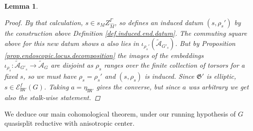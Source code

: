 \documentclass[openany]{amsbook}
\newtheorem{lemma}[theorem]{Lemma}
\theoremstyle{definition}
\theoremstyle{remark}
\numberwithin{equation}{section}
\newcommand{\cA}{\mathcal{A}}
\newcommand{\cE}{\mathcal{E}}
\renewcommand{\-}{\operatorname{-}}
\newcommand{\ctA}{\widetilde{\cA}}
\newcommand{\fM}{\mathfrak{M}}
\newcommand{\fG}{\mathfrak{G}}
\begin{document}
\begin{lemma}
\begin{proof}
By that calculation, $s \in s_M Z_{\widehat{M}}^\Gamma$, so defines an induced datum $(s, \rho_s')$ by the construction above Definition \ref{def.induced.end.datum}. The commuting square above for this new datum shows $a$ also lies in $\iota_{\rho_s'}(\ctA_{G'_s})$. But by Proposition \ref{prop.endoscopic.locus.decomposition} the images of the embeddings $\iota_{\rho_s} : \ctA_{G'_s} \to \ctA_G$ are disjoint as $\rho_s$ ranges over the finite collection of torsors for a fixed $s$, so we must have $\rho_s = \rho_s'$ and $(s, \rho_s)$ is induced. Since $\fG'$ is elliptic, $s \in \cE_{\fM'}^f(G)$. Taking $a = \eta_{\fM'}$ gives the converse, but since $a$ was arbitrary we get also the stalk-wise statement.
    \end{proof}
\end{lemma}

We deduce our main cohomological theorem, under our running hypothesis of $G$ quasisplit reductive with anisotropic center.
\end{document}
